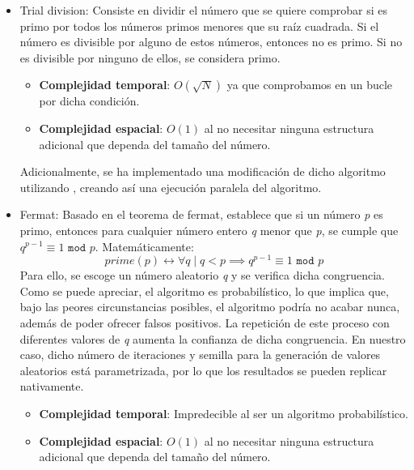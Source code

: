 \begin{itemize}[leftmargin=13pt]
    \item Trial division\cite{Trial division}: Consiste en dividir el número que se quiere comprobar si es primo por todos los números primos menores que su raíz cuadrada. Si el número es divisible por alguno de estos números, entonces no es primo. Si no es divisible por ninguno de ellos, se considera primo.\begin{itemize}
        \item \textbf{Complejidad temporal}: $O(\sqrt{N})$ ya que comprobamos en un bucle por dicha condición.
        \item \textbf{Complejidad espacial}: $O(1)$ al no necesitar ninguna estructura adicional que dependa del tamaño del número.
    \end{itemize}\bigskip

    Adicionalmente, se ha implementado una modificación de dicho algoritmo utilizando \cite{Thread pools in Java}, creando así una ejecución paralela del algoritmo.\bigskip
    
    \item Fermat\cite{Fermat primality test}:
    Basado en el teorema de fermat, establece que si un número \textit{p} es primo, entonces para cualquier número entero \textit{q} menor que \textit{p}, se cumple que $q^{p-1}\equiv 1 \texttt{ mod } p$. Matemáticamente:
    \[prime(p) \longleftrightarrow \forall q \mid q < p \implies q^{p-1} \equiv 1 \texttt{ mod } p\]
    Para ello, se escoge un número aleatorio \textit{q} y se verifica dicha congruencia. Como se puede apreciar, el algoritmo es probabilístico, lo que implica que, bajo las peores circunstancias posibles, el algoritmo podría no acabar nunca, además de poder ofrecer falsos positivos. La repetición de este proceso con diferentes valores de \textit{q} aumenta la confianza de dicha congruencia. En nuestro caso, dicho número de iteraciones y semilla para la generación de valores aleatorios está parametrizada, por lo que los resultados se pueden replicar nativamente.
    \begin{itemize}
        \item \textbf{Complejidad temporal}: Impredecible al ser un algoritmo probabilístico.
        \item \textbf{Complejidad espacial}: $O(1)$ al no necesitar ninguna estructura adicional que dependa del tamaño del número.
    \end{itemize}\bigskip
    

\end{itemize}
